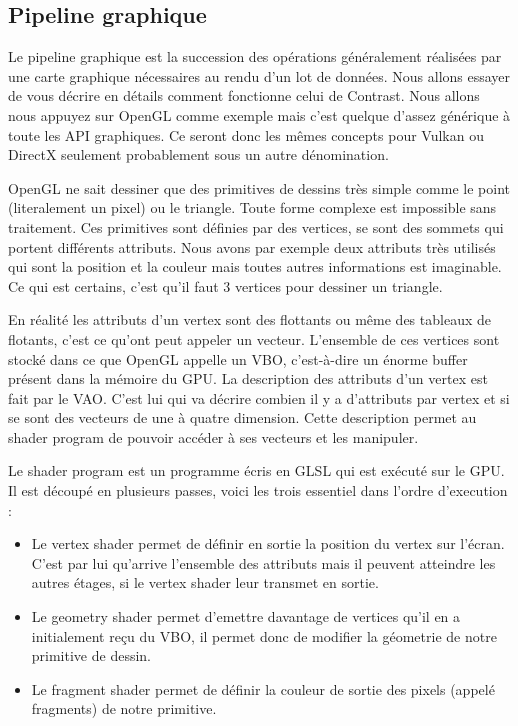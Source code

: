 \documentclass[12pt]{article}
\begin{document}
\subsection{Pipeline graphique}

Le pipeline graphique est la succession des opérations généralement réalisées par une carte graphique nécessaires au rendu d’un lot de données. Nous allons essayer de vous décrire en détails comment
fonctionne celui de Contrast. Nous allons nous appuyez sur OpenGL comme exemple mais c'est quelque d'assez générique à toute les API graphiques. Ce seront donc les mêmes concepts pour
Vulkan ou DirectX seulement probablement sous un autre dénomination.

OpenGL ne sait dessiner que des primitives de dessins très simple comme le point (literalement un pixel) ou le triangle. Toute forme complexe est impossible sans traitement.
Ces primitives sont définies par des vertices, se sont des sommets qui portent différents attributs. Nous avons par exemple deux attributs très utilisés qui sont la position et
la couleur mais toutes autres informations est imaginable. Ce qui est certains, c'est qu'il faut 3 vertices pour dessiner un triangle.

En réalité les attributs d'un vertex sont des flottants ou même des tableaux de flotants, c'est ce qu'ont peut appeler un vecteur. L'ensemble de ces vertices sont stocké dans ce
que OpenGL appelle un \gls{VBO}, c'est-à-dire un énorme buffer présent dans la mémoire du GPU. La description des attributs d'un vertex est fait par le \gls{VAO}.
C'est lui qui va décrire combien il y a d'attributs par vertex et si se sont des vecteurs de une à quatre dimension.
Cette description permet au shader program de pouvoir accéder à ses vecteurs et les manipuler.

Le shader program est un programme écris en \gls{GLSL} qui est exécuté sur le GPU. Il est découpé en plusieurs passes, voici les trois essentiel dans l'ordre d'execution :
\begin{itemize}
    \item Le vertex shader permet de définir en sortie la position du vertex sur l'écran. C'est par lui qu'arrive l'ensemble
des attributs mais il peuvent atteindre les autres étages, si le vertex shader leur transmet en sortie.
    \item Le geometry shader permet d'emettre davantage de vertices qu'il en a initialement reçu du VBO, il permet donc de modifier la géometrie de notre primitive de dessin.
    \item Le fragment shader permet de définir la couleur de sortie des pixels (appelé fragments) de notre primitive.
\end{itemize}
\end{document}
